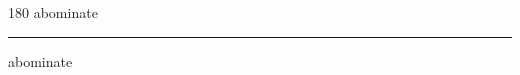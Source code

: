 
\begin{frame}
\begin{center}
\begin{turn}{180}
{\fontsize{2.5cm}{1em}\selectfont abominate}
\end{turn}
\vspace{1em}\par  
\hrule
\vspace{1em}\par  
{\fontsize{2.5cm}{1em}\selectfont abominate}
\end{center}
\end{frame}
